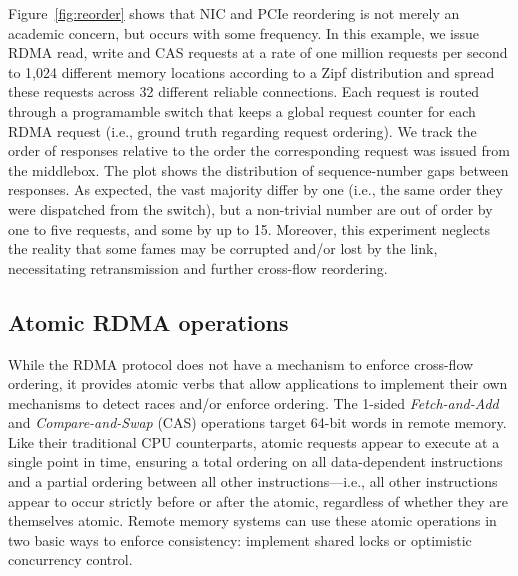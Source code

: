Figure~\ref{fig:reorder} shows that NIC
and PCIe reordering is not merely an academic concern, but occurs with
some frequency.  In this example, we issue RDMA read, write and CAS
requests at a rate of one million requests per second to 1,024
different memory locations according to a Zipf distribution and spread
these requests across 32 different reliable connections. Each request is routed
through a programamble switch that keeps a global request counter for
each RDMA request (i.e., ground truth regarding request ordering). We
track the order of responses relative to the order the corresponding
request was issued from the middlebox. The plot shows the distribution
of sequence-number gaps between responses. As expected, the vast
majority differ by one (i.e., the same order they were dispatched from
the switch), but a non-trivial number are out of order by one to five
requests, and some by up to 15.  Moreover, this experiment neglects
the reality that some fames may be corrupted and/or lost by the link,
necessitating retransmission and further cross-flow reordering.






\subsection{Atomic RDMA operations} 

While the RDMA protocol does not have a mechanism to enforce
cross-flow ordering, it provides atomic verbs that allow applications
to implement their own mechanisms to detect races and/or enforce
ordering.  The 1-sided \textit{Fetch-and-Add} and
\textit{Compare-and-Swap} (CAS) operations target 64-bit words in
remote memory.  Like their traditional CPU counterparts, atomic
requests appear to execute at a single point in time, ensuring a total
ordering on all data-dependent instructions and a partial ordering
between all other instructions---i.e., all other instructions appear
to occur strictly before or after the atomic, regardless of whether
they are themselves atomic.  Remote memory systems can use these
atomic operations in two basic ways to enforce consistency: implement
shared locks or optimistic concurrency control.

